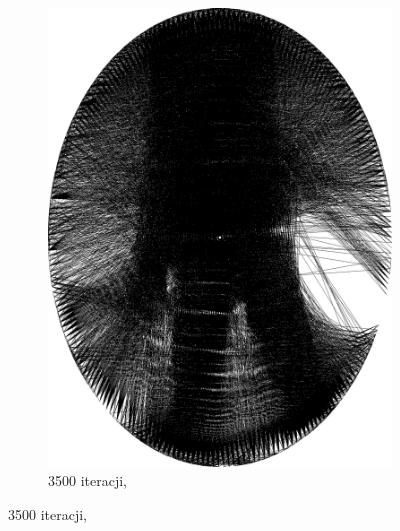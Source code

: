 \documentclass[a4paper, 12pt, polish, twoside]{extreport}
\begin{document}
\begin{figure}[H]
\begin{subfigure}{0.19\textwidth}
            \includegraphics[width = \textwidth]{img/2-theory/aldrin/030mask-aldrin_ellipse_3500_threaded.png}
            \caption{3500 iteracji, }
            \label{przyklad-aldrin-o}
        \end{subfigure}
        

\end{figure}
\end{document}
